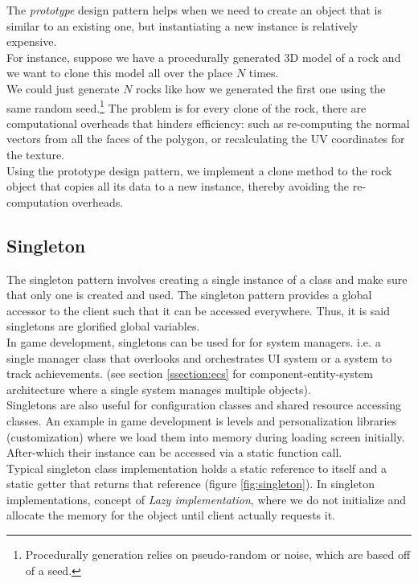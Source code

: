 \documentclass[10pt,letterpaper]{article}
\newcommand{\bs}{\bigskip}
\begin{document}
\begin{multicols}{2}
The \textit{prototype} design pattern helps when we need to create an object that is similar to an existing one, but instantiating a new instance is relatively expensive.\bs
\\
For instance, suppose we have a procedurally generated 3D model of a rock and we want to clone this model all over the place $N$ times.\bs
\\
We could just generate $N$ rocks like how we generated the first one using the same random seed.\footnote{Procedurally generation relies on pseudo-random or noise, which are based off of a seed.} The problem is for every clone of the rock, there are computational overheads that hinders efficiency: such as re-computing the normal vectors from all the faces of the polygon, or recalculating the UV coordinates for the texture.\bs
\\
Using the prototype design pattern, we implement a clone method to the rock object that copies all its data to a new instance, thereby avoiding the re-computation overheads.

\subsection{Singleton}

The singleton pattern involves creating a single instance of a class and make sure that only one is created and used\cite{tp-singleton}. The singleton pattern provides a global accessor to the client such that it can be accessed everywhere. Thus, it is said singletons are glorified global variables.\cite{ood-singleton, sm-singleton}\bs
\\
In game development, singletons can be used for for system managers. i.e. a single manager class that overlooks and orchestrates UI system or a system to track achievements. (see section \ref{ssection:ecs} for component-entity-system architecture where a single system manages multiple objects).\bs
\\
Singletons are also useful for configuration classes and shared resource accessing classes.\cite{ood-singleton} An example in game development is levels and personalization libraries (customization) where we load them into memory during loading screen initially. After-which their instance can be accessed via a static function call.\bs
\\
Typical singleton class implementation holds a static reference to itself and a static getter that returns that reference (figure \ref{fig:singleton}). In singleton implementations, concept of \textit{Lazy implementation}, where we do not initialize and allocate the memory for the object until client actually requests it.


\end{multicols}
\end{document}
